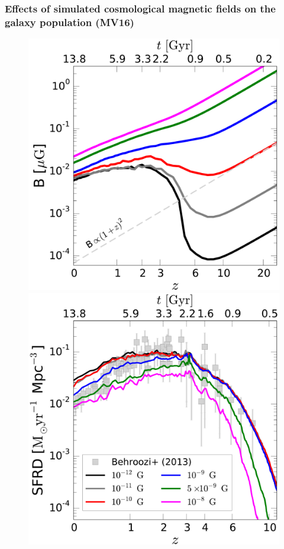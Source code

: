 \documentclass[10pt,aspectratio=169]{beamer}
\begin{document}
\begin{frame}
	\frametitle{Effects of simulated cosmological magnetic fields on the galaxy population (MV16)}	
	\begin{figure}
		\begin{minipage}[b]{0.35\linewidth}
			\centering
			\includegraphics[width=\textwidth]{images/marinacci_2016/fig1a.pdf}
		\end{minipage}
		\begin{minipage}[b]{0.35\linewidth}
			\centering
			\includegraphics[width=\textwidth]{images/marinacci_2016/fig1b.pdf}

\end{minipage}
\end{figure}
\end{frame}
\end{document}
